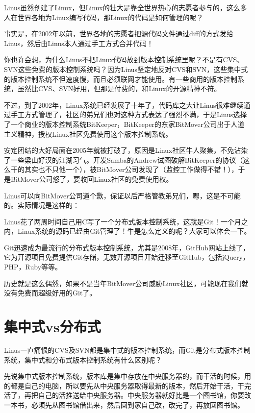 Linus虽然创建了Linux，但Linux的壮大是靠全世界热心的志愿者参与的，这么多人在世界各地为Linux编写代码，那Linux的代码是如何管理的呢？

事实是，在2002年以前，世界各地的志愿者把源代码文件通过diff的方式发给Linus，然后由Linus本人通过手工方式合并代码！

你也许会想，为什么Linus不把Linux代码放到版本控制系统里呢？不是有CVS、SVN这些免费的版本控制系统吗？因为Linus坚定地反对CVS和SVN，这些集中式的版本控制系统不但速度慢，而且必须联网才能使用。有一些商用的版本控制系统，虽然比CVS、SVN好用，但那是付费的，和Linux的开源精神不符。

不过，到了2002年，Linux系统已经发展了十年了，代码库之大让Linus很难继续通过手工方式管理了，社区的弟兄们也对这种方式表达了强烈不满，于是Linus选择了一个商业的版本控制系统BitKeeper，BitKeeper的东家BitMover公司出于人道主义精神，授权Linux社区免费使用这个版本控制系统。

安定团结的大好局面在2005年就被打破了，原因是Linux社区牛人聚集，不免沾染了一些梁山好汉的江湖习气。开发Samba的Andrew试图破解BitKeeper的协议（这么干的其实也不只他一个），被BitMover公司发现了（监控工作做得不错！），于是BitMover公司怒了，要收回Linux社区的免费使用权。

Linus可以向BitMover公司道个歉，保证以后严格管教弟兄们，嗯，这是不可能的。实际情况是这样的：

Linus花了两周时间自己用C写了一个分布式版本控制系统，这就是Git！一个月之内，Linux系统的源码已经由Git管理了！牛是怎么定义的呢？大家可以体会一下。

Git迅速成为最流行的分布式版本控制系统，尤其是2008年，GitHub网站上线了，它为开源项目免费提供Git存储，无数开源项目开始迁移至GitHub，包括jQuery，PHP，Ruby等等。

历史就是这么偶然，如果不是当年BitMover公司威胁Linux社区，可能现在我们就没有免费而超级好用的Git了。

\section{集中式vs分布式}
Linus一直痛恨的CVS及SVN都是集中式的版本控制系统，而Git是分布式版本控制系统，集中式和分布式版本控制系统有什么区别呢？

先说集中式版本控制系统，版本库是集中存放在中央服务器的，而干活的时候，用的都是自己的电脑，所以要先从中央服务器取得最新的版本，然后开始干活，干完活了，再把自己的活推送给中央服务器。中央服务器就好比是一个图书馆，你要改一本书，必须先从图书馆借出来，然后回到家自己改，改完了，再放回图书馆。

